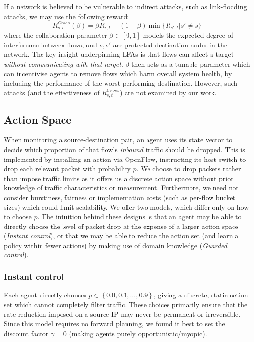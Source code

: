 \documentclass[10pt, times, conference, letterpaper]{IEEEtran}
\begin{document}
If a network is believed to be vulnerable to indirect attacks, such as link-flooding attacks, we may use the following reward:
\begin{equation}
	R_{s,t}^{\mathit{Cross}}(\beta) = \beta R_{s,t} + (1 - \beta) \min{\{R_{s',t} | s' \ne s\}} \label{eqn:lfa-reward}
\end{equation}
where the collaboration parameter $\beta \in [0,1]$ models the expected degree of interference between flows, and $s, s'$ are protected destination nodes in the network.
The key insight underpinning LFAs is that flows can affect a target \emph{without communicating with that target}.
$\beta$ then acts as a tunable parameter which can incentivise agents to remove flows which harm overall system health, by including the performance of the worst-performing destination.
However, such attacks (and the effectiveness of $R_{s,t}^{\mathit{Cross}}$) are not examined by our work.

\subsection{Action Space}
When monitoring a source-destination pair, an agent uses its state vector to decide which proportion of that flow's \emph{inbound} traffic should be dropped.
This is implemented by installing an action via OpenFlow, instructing its host switch to drop each relevant packet with probability $p$.
We choose to drop packets rather than impose traffic limits as it offers us a discrete action space without prior knowledge of traffic characteristics or measurement.
Furthermore, we need not consider burstiness, fairness or implementation costs (such as per-flow bucket sizes) which could limit scalability.
We offer two models, which differ only on how to choose $p$.
The intuition behind these designs is that an agent may be able to directly choose the level of packet drop at the expense of a larger action space (\emph{Instant control}), or that we may be able to reduce the action set (and learn a policy within fewer actions) by making use of domain knowledge (\emph{Guarded control}).

\subsubsection{Instant control}
Each agent directly chooses $p \in \left\{ 0.0, 0.1, \ldots, 0.9 \right\}$, giving a discrete, static action set which cannot completely filter traffic.
These choices primarily ensure that the rate reduction imposed on a source IP may never be permanent or irreversible.
Since this model requires no forward planning, we found it best to set the discount factor $\gamma=0$ (making agents purely opportunistic/myopic).
\end{document}
